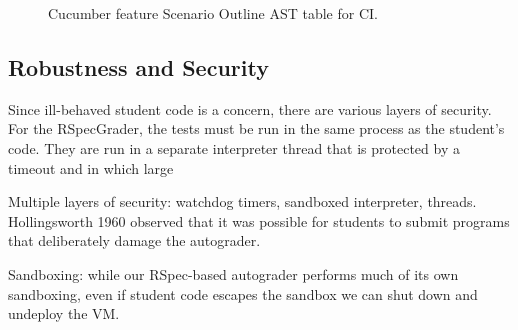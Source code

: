 \begin{figure}[!htbp]
  \centering
  \begin{minipage}{0.99\textwidth}%
  \lstset{tabsize=1,basicstyle=\scriptsize\ttfamily}%
  \end{minipage}
  \caption{\label{fig:rag-ci}%
  Cucumber feature Scenario Outline AST table for CI.
}
\end{figure}


\subsection{Robustness and Security}


Since ill-behaved student code is a concern, there are various layers of
security.  For the RSpecGrader, the tests must be run in the same
process as the student's code.  They are run in a separate interpreter
thread that is protected by a timeout and in which large 

Multiple layers of security: watchdog timers, sandboxed interpreter, threads. Hollingsworth 1960 observed that it was possible for students to submit programs that deliberately damage the autograder.


Sandboxing: while our RSpec-based autograder performs much of its
  own sandboxing, even if student code escapes the sandbox we can shut
  down and undeploy the VM.  




